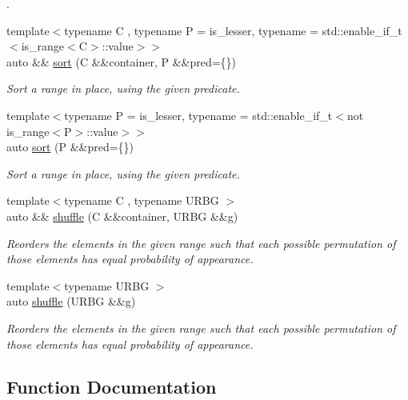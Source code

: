 \begin{DoxyCompactItemize}
\begin{DoxyCompactList}
. \end{DoxyCompactList}\item 
{\footnotesize template$<$typename C , typename P  = is\+\_\+lesser, typename  = std\+::enable\+\_\+if\+\_\+t$<$is\+\_\+range$<$\+C$>$\+::value$>$$>$ }\\auto \&\& \mbox{\hyperlink{namespacerah_1_1action_a2bddee3b65a2ecf86d2c3ac49bb41183}{sort}} (C \&\&container, P \&\&pred=\{\})
\begin{DoxyCompactList}\small\item\em Sort a range in place, using the given predicate. \end{DoxyCompactList}\item 
{\footnotesize template$<$typename P  = is\+\_\+lesser, typename  = std\+::enable\+\_\+if\+\_\+t$<$not is\+\_\+range$<$\+P$>$\+::value$>$$>$ }\\auto \mbox{\hyperlink{namespacerah_1_1action_ac1603fdf8fc87e84c277c216a5176674}{sort}} (P \&\&pred=\{\})
\begin{DoxyCompactList}\small\item\em Sort a range in place, using the given predicate. \end{DoxyCompactList}\item 
{\footnotesize template$<$typename C , typename U\+R\+BG $>$ }\\auto \&\& \mbox{\hyperlink{namespacerah_1_1action_ae775b99f4520e9cb7ef61acb3fccb1ca}{shuffle}} (C \&\&container, U\+R\+BG \&\&g)
\begin{DoxyCompactList}\small\item\em Reorders the elements in the given range such that each possible permutation of those elements has equal probability of appearance. \end{DoxyCompactList}\item 
{\footnotesize template$<$typename U\+R\+BG $>$ }\\auto \mbox{\hyperlink{namespacerah_1_1action_add6b8e704a8e603302290792a45a5c06}{shuffle}} (U\+R\+BG \&\&g)
\begin{DoxyCompactList}\small\item\em Reorders the elements in the given range such that each possible permutation of those elements has equal probability of appearance. \end{DoxyCompactList}\end{DoxyCompactItemize}


\subsection{Function Documentation}
\mbox{\label{namespacerah_1_1action_ab774cddf0da3ae6a4b505d8a2e05b0c7}} 
